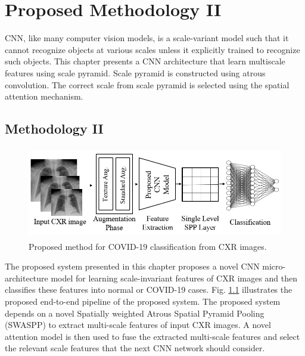 
\chapter{Proposed Methodology II} %

\label{chp:proposed2} %


CNN, like many computer vision models, is a scale-variant \cite{van2017learning} model such that it cannot recognize objects at various scales unless it explicitly trained to recognize such objects.  This chapter presents a CNN architecture that learn multiscale features using scale pyramid. Scale pyramid is constructed using atrous convolution. The correct scale from scale pyramid is selected using the spatial attention mechanism.
\section{Methodology II} 

\begin{center}
    \begin{figure}[htbp]
    \centerline{\includegraphics[height=40mm,width=15cm]{Figures/ProposedPipe.png}}
    \caption{Proposed method for COVID-19 classification from CXR images.}\label{ProposedPipe}\end{figure}\end{center}
    
The proposed system presented in this chapter proposes a novel CNN micro-architecture model for learning  scale-invariant features of   CXR images and then classifies these features into normal or COVID-19 cases. Fig. \ref{ProposedPipe} illustrates the proposed end-to-end pipeline  of the proposed system. The proposed system depends on a novel Spatially weighted Atrous Spatial Pyramid Pooling (SWASPP) to extract multi-scale features of input CXR images. A novel attention model is then used to fuse the extracted multi-scale  features and select the relevant scale features that the next CNN network should consider.
